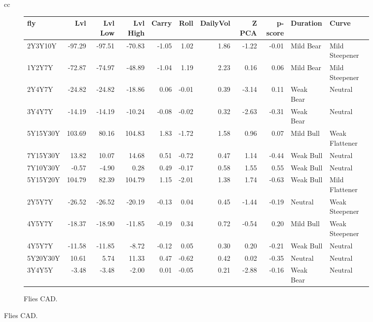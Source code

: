 \documentclass[a4paper,twoside]{report}
\begin{document}
\begin{figure}[htbp]
\begin{tabular}[c]{cc}
 \begin{subfigure}[c]{0.5\textwidth}
 \caption{Flies CAD.}
 \label{fig:Flies CAD}
 \begin{adjustbox}{max width=\textwidth}
 \begin{tabular}{lrrrrrrrrll}
\hline
      fly &     Lvl &  Lvl Low &  Lvl High &  Carry &  Roll &  DailyVol &  Z PCA &  p-score &   Duration &           Curve \\
\hline
  2Y3Y10Y &  -97.29 &   -97.51 &    -70.83 &  -1.05 &  1.02 &      1.86 &  -1.22 &    -0.01 &  Mild Bear &  Mild Steepener \\
   1Y2Y7Y &  -72.87 &   -74.97 &    -48.89 &  -1.04 &  1.19 &      2.23 &   0.16 &     0.06 &  Mild Bear &  Mild Steepener \\
   2Y4Y7Y &  -24.82 &   -24.82 &    -18.86 &   0.06 & -0.01 &      0.39 &  -3.14 &     0.11 &  Weak Bear &         Neutral \\
   3Y4Y7Y &  -14.19 &   -14.19 &    -10.24 &  -0.08 & -0.02 &      0.32 &  -2.63 &    -0.31 &  Weak Bear &         Neutral \\
 5Y15Y30Y &  103.69 &    80.16 &    104.83 &   1.83 & -1.72 &      1.58 &   0.96 &     0.07 &  Mild Bull &  Weak Flattener \\
 7Y15Y30Y &   13.82 &    10.07 &     14.68 &   0.51 & -0.72 &      0.47 &   1.14 &    -0.44 &  Weak Bull &         Neutral \\
 7Y10Y30Y &   -0.57 &    -4.90 &      0.28 &   0.49 & -0.17 &      0.58 &   1.55 &     0.55 &  Weak Bull &         Neutral \\
 5Y15Y20Y &  104.79 &    82.39 &    104.79 &   1.15 & -2.01 &      1.38 &   1.74 &    -0.63 &  Weak Bull &  Mild Flattener \\
   2Y5Y7Y &  -26.52 &   -26.52 &    -20.19 &  -0.13 &  0.04 &      0.45 &  -1.44 &    -0.19 &    Neutral &  Weak Steepener \\
   4Y5Y7Y &  -18.37 &   -18.90 &    -11.85 &  -0.19 &  0.34 &      0.72 &  -0.54 &     0.20 &  Mild Bull &  Weak Steepener \\
   4Y5Y7Y &  -11.58 &   -11.85 &     -8.72 &  -0.12 &  0.05 &      0.30 &   0.20 &    -0.21 &  Weak Bull &         Neutral \\
 5Y20Y30Y &   10.61 &     5.74 &     11.33 &   0.47 & -0.62 &      0.42 &   0.02 &    -0.35 &    Neutral &         Neutral \\
   3Y4Y5Y &   -3.48 &    -3.48 &     -2.00 &   0.01 & -0.05 &      0.21 &  -2.88 &    -0.16 &  Weak Bear &         Neutral \\

\end{tabular}
\end{adjustbox}
\end{subfigure}
\end{tabular}
\end{figure}
\end{document}
